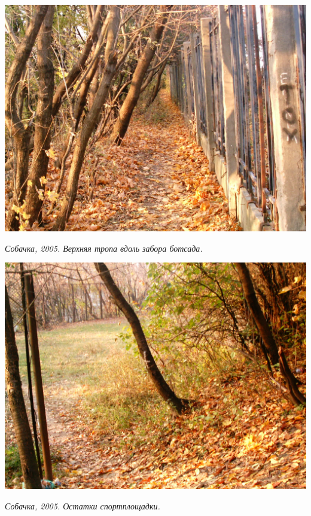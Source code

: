 \begin{center}
\includegraphics[width=0.95\linewidth]{rpix/imag0044.jpg}

\textit{Собачка, 2005. Верхняя тропа вдоль забора ботсада.}
\end{center}


\begin{center}
\includegraphics[width=\linewidth]{rpix/imag0052.jpg}

\textit{Собачка, 2005. Остатки спортплощадки.}
\end{center}



